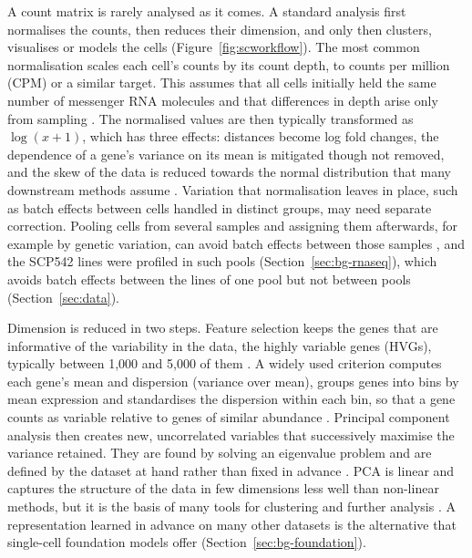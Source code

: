 A count matrix is rarely analysed as it comes. A standard analysis first normalises the counts, then
reduces their dimension, and only then clusters, visualises or models the cells
\cite{luecken2019} (Figure~\ref{fig:scworkflow}). The most common normalisation scales each cell's counts by its count
depth, to counts per million (CPM) or a similar target. This assumes that all cells initially held the same
number of messenger RNA molecules and that differences in depth arise only from sampling
\cite{luecken2019}. The normalised values are then typically transformed as $\log(x+1)$, which has three
effects: distances become log fold changes, the dependence of a gene's variance on its mean is mitigated
though not removed, and the skew of the data is reduced towards the normal distribution that many
downstream methods assume \cite{luecken2019}. Variation that normalisation leaves in place, such as batch
effects between cells handled in distinct groups, may need separate correction. Pooling cells from
several samples and assigning them afterwards, for example by genetic variation, can avoid batch effects
between those samples \cite{luecken2019}, and the SCP542 lines were profiled in such pools
(Section~\ref{sec:bg-rnaseq}), which avoids batch effects between the lines of one pool but not between
pools (Section~\ref{sec:data}).

Dimension is reduced in two steps. Feature selection keeps the genes that are informative of the
variability in the data, the highly variable genes (HVGs), typically between 1,000 and 5,000 of them
\cite{luecken2019}. A widely used criterion computes each gene's mean and dispersion (variance over mean),
groups genes into bins by mean expression and standardises the dispersion within each bin, so that a gene
counts as variable relative to genes of similar abundance \cite{satija2015,wolf2018scanpy}. Principal
component analysis then creates new, uncorrelated variables that successively maximise the variance
retained. They are found by solving an eigenvalue problem and are defined by the dataset at hand rather
than fixed in advance \cite{jolliffe2016}. PCA is linear and captures the structure of the data in few
dimensions less well than non-linear methods, but it is the basis of many tools for clustering and
further analysis \cite{luecken2019}. A representation learned in advance on many other datasets is the
alternative that single-cell foundation models offer (Section~\ref{sec:bg-foundation}).

